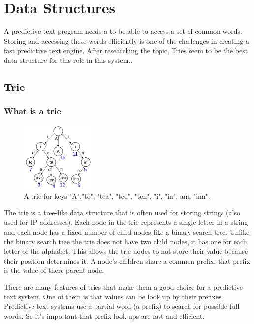 \documentclass[10pt]{article} %
\begin{document}
	\section{Data Structures}
		A predictive text program needs a to be able to access a set of common words.
		 Storing and accessing these words efficiently is one of the challenges in creating a fast predictive text engine.
		  After researching the topic, Tries seem to be the best data structure for this role in this system.\cite{book:ADS:trie}.
		  
		\subsection{Trie} \label{section:trie}
			\subsubsection{What is a trie}
			
				\begin{figure} %
    				\centering
    				\includegraphics[width=0.33\textwidth]{Trie_example}
    				\caption{A trie for keys "A","to", "tea", "ted", "ten", "i", "in", and "inn"\cite{fig:Trie_example}.}
    				\label{fig:Trie_example}
				\end{figure}
				
				The trie is a tree-like data structure that is often used for storing strings (also used for IP addresses). Each node in the trie represents a single letter in a string and each node has a fixed number of child nodes like a binary search tree. Unlike the binary search tree the trie does not have two child nodes, it has one for each letter of the alphabet. This allows the trie nodes to not store their value because their position determines it. A node's children share a common prefix, that prefix is the value of there parent node.

                There are many features of tries that make them a good choice for a predictive text system. One of them is that values can be look up by their prefixes. Predictive text systems use a partial word (a prefix) to search for possible full words. So it's important that prefix look-ups are fast and efficient. 
				
\end{document}
